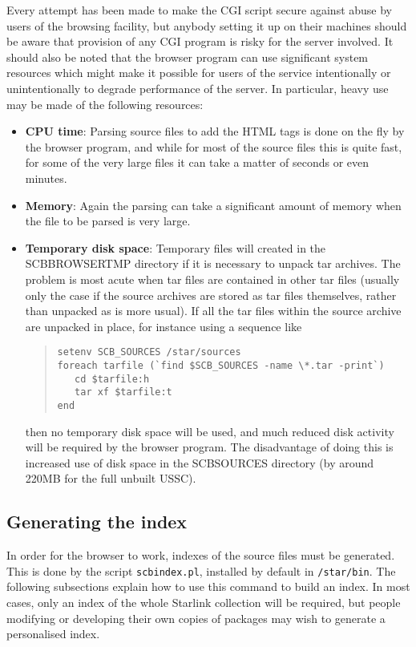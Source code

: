 \documentclass[twoside,11pt]{article}
\newcommand{\xlabel}[1]{}
\renewcommand{\_}{\texttt{\symbol{95}}}
\begin{document}
Every attempt has been made to make the CGI script secure against
abuse by users of the browsing facility, but anybody setting it 
up on their machines should be aware
that provision of any CGI program is risky for the server involved.
It should also be noted that the browser 
program can use significant system resources which might 
make it possible for users of the service intentionally or 
unintentionally to degrade performance of the server.
In particular, heavy use may be made of the following resources:
\begin{itemize}
\item {\bf CPU time}: 
Parsing source files to add the HTML tags is done on the fly by 
the browser program, and while for most of the source files this 
is quite fast, for some of the very large files it can 
take a matter of seconds or even minutes.
\item {\bf Memory}:
Again the parsing can take a significant amount of memory when the
file to be parsed is very large.
\item {\bf Temporary disk space}:
Temporary files will created in the SCB\_BROWSER\_TMP directory
if it is necessary to unpack tar archives.  The problem is most acute
when tar files are contained in other tar files (usually only the
case if the source archives are stored as tar files themselves,
rather than unpacked as is more usual).  
If all the tar files within the source archive are unpacked in place,
for instance using a sequence like 
\begin{quote}
\begin{verbatim}
setenv SCB_SOURCES /star/sources
foreach tarfile (`find $SCB_SOURCES -name \*.tar -print`)
   cd $tarfile:h
   tar xf $tarfile:t
end
\end{verbatim}
\end{quote}
then no temporary disk space will be used, and much reduced disk
activity will be required by the browser program.
The disadvantage of doing this is increased use of disk space
in the SCB\_SOURCES directory 
(by around 220MB for the full unbuilt USSC). 
\end{itemize}





\subsection{\xlabel{sec:indexing} Generating the index}

In order for the browser to work, indexes of the source files must be
generated.  This is done by the script {\tt scbindex.pl}, installed
by default in {\tt /star/bin}.
The following subsections explain how to use this command to
build an index.  In most cases, only an index of the whole Starlink
collection will be required, but people modifying or developing
their own copies of packages may wish to generate a personalised index.
\end{document}
